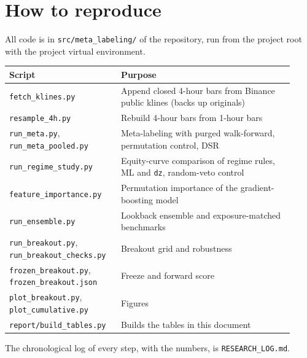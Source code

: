 \documentclass[11pt,a4paper]{article}
\newcommand{\code}[1]{\texttt{#1}}
\begin{document}
\section{How to reproduce}
All code is in \code{src/meta\_labeling/} of the repository, run from the project root with the project virtual environment.
\begin{center}\small\begin{tabular}{p{0.34\linewidth}p{0.58\linewidth}}\toprule
Script & Purpose\\\midrule
\code{fetch\_klines.py} & Append closed 4-hour bars from Binance public klines (backs up originals)\\
\code{resample\_4h.py} & Rebuild 4-hour bars from 1-hour bars\\
\code{run\_meta.py}, \code{run\_meta\_pooled.py} & Meta-labeling with purged walk-forward, permutation control, DSR\\
\code{run\_regime\_study.py} & Equity-curve comparison of regime rules, ML and \code{dz}, random-veto control\\
\code{feature\_importance.py} & Permutation importance of the gradient-boosting model\\
\code{run\_ensemble.py} & Lookback ensemble and exposure-matched benchmarks\\
\code{run\_breakout.py}, \code{run\_breakout\_checks.py} & Breakout grid and robustness\\
\code{frozen\_breakout.py}, \code{frozen\_breakout.json} & Freeze and forward score\\
\code{plot\_breakout.py}, \code{plot\_cumulative.py} & Figures\\
\code{report/build\_tables.py} & Builds the tables in this document\\\bottomrule\end{tabular}\end{center}
The chronological log of every step, with the numbers, is \code{RESEARCH\_LOG.md}.
\end{document}
